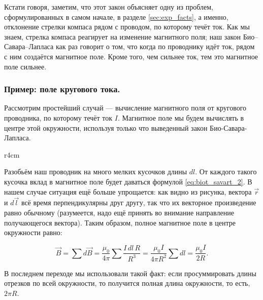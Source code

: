 \documentclass[a4paper,12pt]{article}
\numberwithin{equation}{section}
\begin{document}
Кстати говоря, заметим, что этот закон объясняет одну из проблем,
сформулированных в самом начале, в разделе \ref{sec:exp_facts}, а
именно, отклонение стрелки компаса рядом с проводом, по которому течёт
ток. Как мы знаем, стрелка компаса реагирует на изменение магнитного
поля; наш закон Био--Савара--Лапласа как раз говорит о том, что когда
по проводнику идёт ток, рядом с ним создаётся магнитное поле. Кроме
того, чем сильнее ток, тем это магнитное поле сильнее. 

\subsubsection{Пример: поле кругового тока.}
\label{sec:ex_current_circle}

Рассмотрим простейший случай — вычисление магнитного поля
от кругового проводника, по которому течёт ток $I$. Магнитное поле мы
будем вычислять в центре этой окружности, используя только что
выведенный закон Био-Савара-Лапласа.

\begin{wrapfigure}{r}{4cm}
\centering
{}
\label{fig:current_circle}
\end{wrapfigure}

Разобьём наш проводник на много мелких кусочков длины $dl$. От каждого
такого кусочка вклад в магнитное поле будет даваться формулой
\eqref{eq:biot_savart_2}. В нашем случае ситуация ещё больше
упрощается: как видно из рисунка, вектора $\vec{r}$ и $d\vec{l}$ всё
время перпендикулярны друг другу, так что их векторное произведение
равно обычному (разумеется, надо ещё принять во внимание направление
получающегося вектора). Таким образом, полное магнитное поле в центре
окружности равно: 

\begin{equation}
  \label{eq:ex_current_circle}
  \vec{B} = \sum d\vec{B} = \frac{\mu_0}{4\pi} \sum \frac{I\, dl\, R}{R^3} =
  \frac{\mu_0 I}{4 \pi R^2} \sum dl = \frac{\mu_0 I}{2R}.
\end{equation}

В последнем переходе мы использовали такой факт: если просуммировать
длины отрезков по всей окружности, то получится полная длина
окружности, то есть, $2\pi R$.
\end{document}
